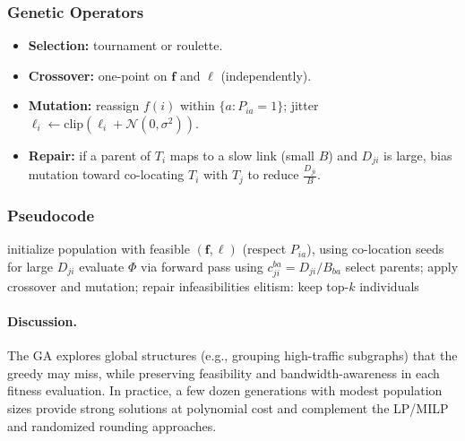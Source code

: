 \subsubsection{Genetic Operators}
\begin{itemize}
    \item \textbf{Selection:} tournament or roulette.
    \item \textbf{Crossover:} one-point on \(\mathbf{f}\) and \(\boldsymbol{\ell}\) (independently).
    \item \textbf{Mutation:} reassign \(f(i)\) within \(\{a:P_{ia}=1\}\); jitter \(\ell_i\leftarrow\text{clip}(\ell_i+\mathcal{N}(0,\sigma^2))\).
    \item \textbf{Repair:} if a parent of \(T_i\) maps to a slow link (small \(B\)) and \(D_{ji}\) is large, bias mutation toward co-locating \(T_i\) with \(T_j\) to reduce \(\tfrac{D_{ji}}{B}\).
\end{itemize}

\subsubsection{Pseudocode}
\begin{algorithm}[t]
\caption{Genetic Algorithm for Bandwidth/Data-Aware Fog Scheduling}
\label{alg:genetic}
\begin{algorithmic}[1]
\STATE initialize population with feasible \((\mathbf{f},\boldsymbol{\ell})\) (respect \(P_{ia}\)), using co-location seeds for large \(D_{ji}\)
\REPEAT
    \STATE evaluate $\Phi$ via forward pass using $c_{ji}^{ba}=D_{ji}/B_{ba}$
    \STATE select parents; apply crossover and mutation; repair infeasibilities
    \STATE elitism: keep top-$k$ individuals
\end{algorithmic}
\end{algorithm}

\paragraph{Discussion.} The GA explores global structures (e.g., grouping high-traffic subgraphs) that the greedy may miss, while preserving feasibility and bandwidth-awareness in each fitness evaluation. In practice, a few dozen generations with modest population sizes provide strong solutions at polynomial cost and complement the LP/MILP and randomized rounding approaches.
